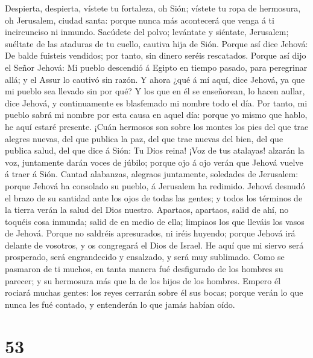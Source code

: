  Despierta, despierta, vístete tu fortaleza, oh Sión;
vístete tu ropa de hermosura, oh Jerusalem, ciudad santa: porque nunca
más acontecerá que venga á ti incircunciso ni inmundo. 
Sacúdete del polvo; levántate y siéntate, Jerusalem; suéltate de las
ataduras de tu cuello, cautiva hija de Sión.  Porque así
dice Jehová: De balde fuisteis vendidos; por tanto, sin dinero seréis
rescatados.  Porque así dijo el Señor Jehová: Mi pueblo
descendió á Egipto en tiempo pasado, para peregrinar allá; y el Assur lo
cautivó sin razón.  Y ahora ¿qué á mí aquí, dice Jehová, ya
que mi pueblo sea llevado sin por qué? Y los que en él se enseñorean, lo
hacen aullar, dice Jehová, y continuamente es blasfemado mi nombre todo
el día.  Por tanto, mi pueblo sabrá mi nombre por esta causa
en aquel día: porque yo mismo que hablo, he aquí estaré presente.
 ¡Cuán hermosos son sobre los montes los pies del que trae
alegres nuevas, del que publica la paz, del que trae nuevas del bien,
del que publica salud, del que dice á Sión: Tu Dios reina! 
¡Voz de tus atalayas! alzarán la voz, juntamente darán voces de júbilo;
porque ojo á ojo verán que Jehová vuelve á traer á Sión. 
Cantad alabanzas, alegraos juntamente, soledades de Jerusalem: porque
Jehová ha consolado su pueblo, á Jerusalem ha redimido. 
Jehová desnudó el brazo de su santidad ante los ojos de todas las
gentes; y todos los términos de la tierra verán la salud del Dios
nuestro.  Apartaos, apartaos, salid de ahí, no toquéis cosa
inmunda; salid de en medio de ella; limpiaos los que lleváis los vasos
de Jehová.  Porque no saldréis apresurados, ni iréis
huyendo; porque Jehová irá delante de vosotros, y os congregará el Dios
de Israel.  He aquí que mi siervo será prosperado, será
engrandecido y ensalzado, y será muy sublimado.  Como se
pasmaron de ti muchos, en tanta manera fué desfigurado de los hombres su
parecer; y su hermosura más que la de los hijos de los hombres.
 Empero él rociará muchas gentes: los reyes cerrarán sobre
él sus bocas; porque verán lo que nunca les fué contado, y entenderán lo
que jamás habían oído.

\hypertarget{section-52}{%
\section{53}\label{section-52}}

